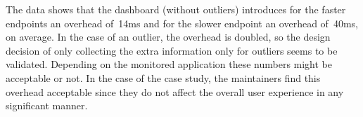 	The data shows that the dashboard (without outliers) introduces for the faster endpoints an overhead of~14ms and for the slower endpoint an overhead of~40ms, on average. 
	In the case of an outlier, the overhead is doubled, so the design decision of only collecting the extra information only for outliers seems to be validated. 
	Depending on the monitored application these numbers might be acceptable or not. In the case of the \zee case study, the maintainers find this overhead acceptable since they do not affect the overall user experience in any significant manner. 



  